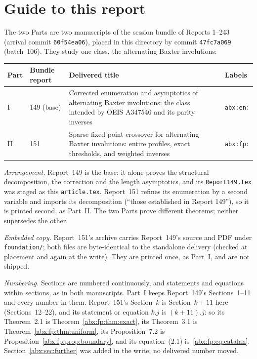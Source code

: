 \documentclass[11pt,letterpaper]{article}
\numberwithin{equation}{section}
\theoremstyle{remark}\newtheorem{remark}[theorem]{Remark}
\newcommand{\file}[1]{\nolinkurl{#1}}
\begin{document}
\section*{Guide to this report}\label{abx:sec:guide}
The two Parts are two manuscripts of the session bundle of Reports 1--243 (arrival commit \texttt{60f54ea06}), placed in this directory by commit \texttt{47fc7a069} (batch~106). They study one class, the alternating Baxter involutions:
\begin{center}
\small
\begin{tabular}{@{}l l >{\raggedright\arraybackslash}p{} l@{}}
\toprule
Part & Bundle report & Delivered title & Labels\\
\midrule
I & 149 (base) & Corrected enumeration and asymptotics of alternating Baxter involutions: the class intended by OEIS A347546 and its parity inverses & \texttt{abx:en:}\\
II & 151 & Sparse fixed point crossover for alternating Baxter involutions: entire profiles, exact thresholds, and weighted inverses & \texttt{abx:fp:}\\
\bottomrule
\end{tabular}
\end{center}
\emph{Arrangement.} Report~149 is the base: it alone proves the structural decomposition, the correction and the length asymptotics, and its \file{Report149.tex} was staged as this \file{article.tex}. Report~151 refines its enumeration by a second variable and imports its decomposition (``those established in Report 149''), so it is printed second, as Part~II. The two Parts prove different theorems; neither supersedes the other.

\emph{Embedded copy.} Report~151's archive carries Report~149's source and PDF under \file{foundation/}; both files are byte-identical to the standalone delivery (checked at placement and again at the write). They are printed once, as Part~I, and are not shipped.

\emph{Numbering.} Sections are numbered continuously, and statements and equations within sections, as in both manuscripts. Part~I keeps Report~149's Sections~1--11 and every number in them. Report~151's Section~$k$ is Section~$k+11$ here (Sections~12--22), and its statement or equation $k.j$ is $(k+11).j$: so its Theorem~2.1 is Theorem~\ref{abx:fp:thm:exact}, its Theorem~3.1 is Theorem~\ref{abx:fp:thm:uniform}, its Proposition~7.2 is Proposition~\ref{abx:fp:prop:boundary}, and its equation~(2.1) is~\eqref{abx:fp:eq:catalan}. Section~\ref{abx:sec:further} was added in the write; no delivered number moved.
\end{document}
